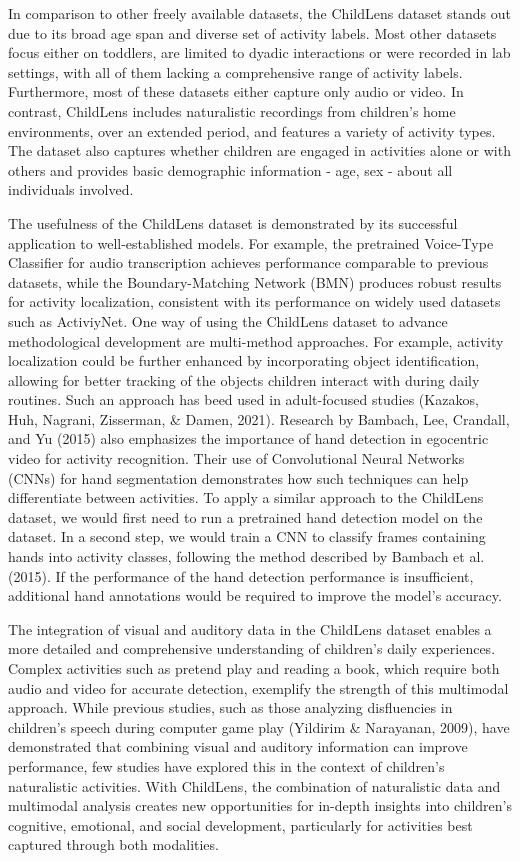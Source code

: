 \documentclass[
  man,floatsintext]{apa6}
\begin{document}
In comparison to other freely available datasets, the ChildLens dataset stands out due to its broad age span and diverse set of activity labels. Most other datasets focus either on toddlers, are limited to dyadic interactions or were recorded in lab settings, with all of them lacking a comprehensive range of activity labels. Furthermore, most of these datasets either capture only audio or video. In contrast, ChildLens includes naturalistic recordings from children's home environments, over an extended period, and features a variety of activity types. The dataset also captures whether children are engaged in activities alone or with others and provides basic demographic information - age, sex - about all individuals involved.

The usefulness of the ChildLens dataset is demonstrated by its successful application to well-established models. For example, the pretrained Voice-Type Classifier for audio transcription achieves performance comparable to previous datasets, while the Boundary-Matching Network (BMN) produces robust results for activity localization, consistent with its performance on widely used datasets such as ActiviyNet. One way of using the ChildLens dataset to advance methodological development are multi-method approaches. For example, activity localization could be further enhanced by incorporating object identification, allowing for better tracking of the objects children interact with during daily routines. Such an approach has beed used in adult-focused studies (Kazakos, Huh, Nagrani, Zisserman, \& Damen, 2021). Research by Bambach, Lee, Crandall, and Yu (2015) also emphasizes the importance of hand detection in egocentric video for activity recognition. Their use of Convolutional Neural Networks (CNNs) for hand segmentation demonstrates how such techniques can help differentiate between activities. To apply a similar approach to the ChildLens dataset, we would first need to run a pretrained hand detection model on the dataset. In a second step, we would train a CNN to classify frames containing hands into activity classes, following the method described by Bambach et al. (2015). If the performance of the hand detection performance is insufficient, additional hand annotations would be required to improve the model's accuracy.

The integration of visual and auditory data in the ChildLens dataset enables a more detailed and comprehensive understanding of children's daily experiences. Complex activities such as pretend play and reading a book, which require both audio and video for accurate detection, exemplify the strength of this multimodal approach. While previous studies, such as those analyzing disfluencies in children's speech during computer game play (Yildirim \& Narayanan, 2009), have demonstrated that combining visual and auditory information can improve performance, few studies have explored this in the context of children's naturalistic activities. With ChildLens, the combination of naturalistic data and multimodal analysis creates new opportunities for in-depth insights into children's cognitive, emotional, and social development, particularly for activities best captured through both modalities.
\end{document}
